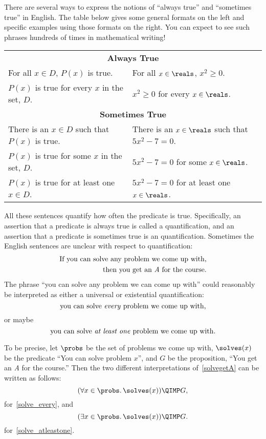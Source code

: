 There are several ways to express the notions of ``always true'' and
``sometimes true'' in English.  The table below gives some general
formats on the left and specific examples using those formats on the
right.  You can expect to see such phrases hundreds of times in
mathematical writing!
%
\begin{center}
\begin{tabular}{ll}
\multicolumn{2}{c}{\textbf{Always True}} \\[1ex]
For all $x \in D$, $P(x)$ is true. & For all $x \in \reals$, $x^2 \geq 0$. \\
$P(x)$ is true for every $x$ in the set, $D$. & $x^2 \geq 0$ for every $x \in \reals$. \\[2ex]
\multicolumn{2}{c}{\textbf{Sometimes True}} \\[1ex]
There is an $x \in D$ such that $P(x)$ is true. & There is an $x \in \reals$ such that $5x^2 - 7 = 0$.\\
$P(x)$ is true for some $x$ in the set, $D$. & $5x^2 - 7 = 0$ for some $x \in \reals$.\\
$P(x)$ is true for at least one $x \in D$. & $5x^2-7=0$ for at least one $x \in \reals$.
\end{tabular}
\end{center}

All these sentences quantify how often the predicate is true.
Specifically, an assertion that a predicate is always true is called a
 quantification, and an assertion that a predicate is
sometimes true is an  quantification.  Sometimes the
English sentences are unclear with respect to quantification:
%
\begin{align}
  \text{If you can solve any problem we come up with,}\notag\\
  \text{then you get an \emph{A} for the course.}\label{solvegetA}
\end{align}
%
The phrase ``you can solve any problem we can come up with'' could
reasonably be interpreted as either a universal or existential
quantification:
\begin{equation}\label{solve_every}
\text{you can solve \emph{every} problem we come up with,}
\end{equation}
or maybe
\begin{equation}\label{solve_atleastone}
\text{you can solve \emph{at least one} problem we come up with.}
\end{equation}

\iffalse
In any case, notice that this quantified phrase appears inside a
larger if-then statement.  This is quite normal; quantified statements
are themselves propositions and can be combined
with \QAND, \QOR, \QIMPLIES, etc., just like any other proposition.
\fi
To be precise, let $\probs$ be the set of problems we come up with,
$\solves(x)$ be the predicate ``You can solve problem $x$'', and $G$
be the proposition, ``You get an \emph{A} for the course.''  Then the
two different interpretations of~\eqref{solvegetA}
can be written as follows:
%
\[
(\forall x \in \probs.\, \solves(x)) \QIMP G,
\]
for~\eqref{solve_every}, and
\[
(\exists x \in \probs.\, \solves(x)) \QIMP G.
\]
for~\eqref{solve_atleastone}.

